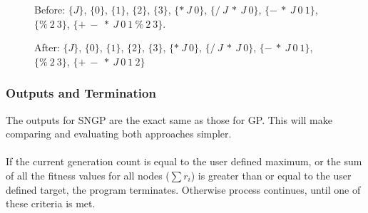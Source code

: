 \documentclass{beamer}
\begin{document}
\begin{frame}
\begin{figure}[H]
{}

\begin{center}
Before:
$\{J\}$, 
$\{0\}$, 
$\{1\}$, 
$\{2\}$, 
$\{3\}$, 
$\{* \ J \ 0\}$,
$\{/ \ J\ *\ J\ 0\}$, 
$\{-\ *\ J \ 0 \ 1\}$, 
$\{\%\ 2\ 3\}$,
$\{+\ -\ *\ J \ 0 \ 1 \ \%\ 2 \ 3\}$.
\end{center}
\begin{center}After: $\{J\}$, $\{0\}$, $\{1\}$, $\{2\}$, $\{3\}$, $\{* \ J \ 0\}$, $\{/ \ J\ *\ J\ 0\}$, $\{-\ *\ J \ 0 \ 1\}$, $\{\%\ 2\ 3\}$, $\{+\ -\ *\ J \ 0 \ 1 \ 2\}$\end{center}

\end{figure}
\end{frame}


\begin{frame}
\frametitle{Outputs and Termination}
The outputs for SNGP are the exact same as those for GP. This will make comparing and evaluating both approaches simpler.\\~\\
If the current generation count is equal to the user defined maximum, or the sum of all the fitness values for all nodes ($\sum r_i$) is greater than or equal to the user defined target, the program terminates. Otherwise process continues, until one of these criteria is met.
\end{frame}


\end{document}

